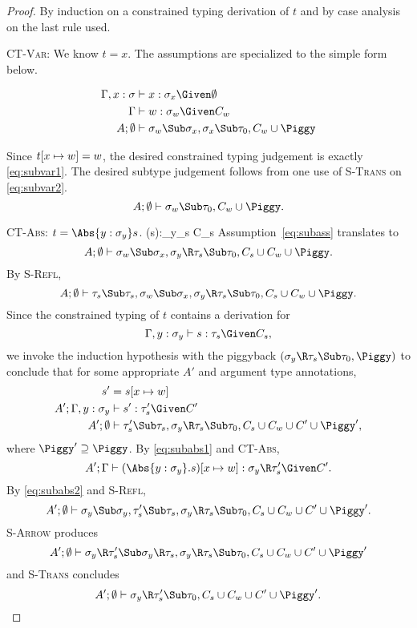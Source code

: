 \begin{proof}
By induction on a constrained typing derivation of $t$ and by
case analysis on the last rule used.

\Case\textsc{CT-Var}: We know $t=x$. The assumptions are
specialized to the simple form below.
\begin{samepage}
\begin{align}
\Gamma,x:\sigma&\vdash x:\sigma_x\Given\Exigent
\notag
\\
\Gamma&\vdash \Xdef:\sigma_\Xdef\Given C_\Xdef
\label{eq:subvar1}
\\
A;\Exigent&\vdash \sigma_\Xdef\Sub\sigma_x,\sigma_x\Sub\tau_0,C_\Xdef\cup\Piggy
\label{eq:subvar2}
\end{align}
\end{samepage}%
Since $t[x\mapsto w]=w$, the desired constrained typing judgement
is exactly \eqref{eq:subvar1}. The desired subtype judgement
follows from one use of \textsc{S-Trans} on \eqref{eq:subvar2}.
\[
A;\Exigent\vdash \sigma_\Xdef\Sub\tau_0,C_\Xdef\cup\Piggy.
\]

\Case\textsc{CT-Abs}: $t=\Abs{y:\sigma_y}s$.
\def\yasump{\Gamma,y:\sigma_y\vdash s:\tau_s\Given C_s}
\infrule[CT-Abs]
{\yasump}
{\Gamma\vdash(s):\sigma_y\R\tau_s \Given C_s}
Assumption~\eqref{eq:subass} translates to
\[
A;\Exigent\vdash
\sigma_\Xdef\Sub\sigma_x,
\sigma_y\R\tau_s\Sub\tau_0,C_s\cup C_\Xdef\cup\Piggy.
\]
By \textsc{S-Refl},
\[
A;\Exigent\vdash
    \tau_s\Sub\tau_s,
\sigma_\Xdef\Sub\sigma_x,
\sigma_y\R\tau_s\Sub\tau_0,C_s\cup C_\Xdef\cup\Piggy.
\]
Since the constrained typing of $t$ contains a derivation for
\[\yasump,\]
we invoke the induction hypothesis with the piggyback
$(\sigma_y\R\tau_s\Sub\tau_0,\Piggy)$ to conclude that for some
appropriate $A'$ and argument type annotations,
\begin{align}
s'&=s[x\mapsto \Xdef]\notag
\\
A';\Gamma,y:\sigma_y&\vdash s' : \tau_s'\Given C'
\label{eq:subabs1}
\\
A';\Exigent&\vdash
    \tau_s'\Sub\tau_s,
\sigma_y\R\tau_s\Sub\tau_0,C_s\cup C_\Xdef\cup C'\cup\Piggy',
\label{eq:subabs2}
\end{align}
where $\Piggy'\supseteq\Piggy$. By \eqref{eq:subabs1} and
\textsc{CT-Abs},
\[
A';\Gamma\vdash(\Abs{y:\sigma_y}.s)[x\mapsto \Xdef] : \sigma_y\R\tau_s'\Given C'.
\]
By \eqref{eq:subabs2} and \textsc{S-Refl},
\[
A';\Exigent\vdash
    \sigma_y\Sub\sigma_y,
    \tau_s'\Sub\tau_s,
\sigma_y\R\tau_s\Sub\tau_0,C_s\cup C_\Xdef\cup C'\cup\Piggy'.
\]
\textsc{S-Arrow} produces
\[
A';\Exigent\vdash
    \sigma_y\R\tau_s'\Sub\sigma_y\R\tau_s,
\sigma_y\R\tau_s\Sub\tau_0,C_s\cup C_\Xdef\cup C'\cup\Piggy'
\]
and \textsc{S-Trans} concludes
\[
A';\Exigent\vdash
    \sigma_y\R\tau_s'\Sub\tau_0,
C_s\cup C_\Xdef\cup C'\cup\Piggy'.
\]


\end{proof}
